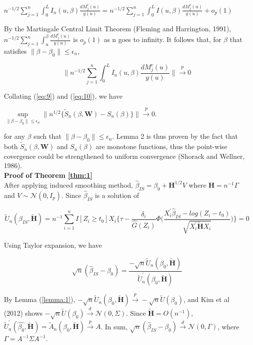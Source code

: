 \documentclass[12pt]{article}
\begin{document}
	\begin{center}
	$n^{-1/2}\sum_{j=1}^{n} \int_{0}^{L}I_n(u,\beta)\frac{dM_j^c(u)}{y(u)}=n^{-1/2}\sum_{j=1}^{n}\int_{0}^{L}I(u,\beta)\frac{dM_j^c(u)}{y(u)}+o_p(1)$
	\end{center}
	
	\noindent By the Martingale Central Limit Theorem (Fleming and Harrington, 1991), $n^{-1/2}\sum_{j=1}^{n}\int_{u}^{\beta}\frac{dM_j^c(u)}{y(u)}$ is $o_p(1)$ as n goes to infinity. It follows that, for $\beta$ that satisfies $\lVert \beta - \beta_0 \rVert \leq \epsilon_n$,
	
	\begin{equation} \label{eq:10}
	\Bigg\lVert n^{-1/2} \sum_{j=1}^{n} \int_{0}^{L} I_n(u,\beta)\frac{dM_j^c(u)}{y(u)} \Bigg\rVert \xrightarrow{p} 0
	\end{equation}
	
	\noindent Collating (\ref{eq:9}) and (\ref{eq:10}), we have
	\begin{center}
	$\sup\limits_{\lVert \beta - \beta_0 \rVert \leq \epsilon_n} \lVert {n^{1/2}} \{ \tilde{S}_n(\beta, \textbf{W})-S_n(\beta) \} \rVert \xrightarrow{p} 0$.
	\end{center}
	
	\noindent for any $\beta$ such that $\lVert \beta - \beta_0 \rVert \leq \epsilon_n$. Lemma 2 is thus proven by the fact that both $\tilde{S}_n(\beta, \textbf{W})$ and $S_n(\beta)$ are monotone functions, thus the point-wise covergence could be strengthened to uniform convergence (Shorack and Wellner, 1986).\\
	
	\noindent \textbf{Proof of Theorem \ref{thm:1}}\\
	After applying induced smoothing method, $\hat{\beta}_{IS} = \beta_0+\textbf{H}^{1/2}V$ where $\textbf{H}=n^{-1}\Gamma$ and $V \sim\mathcal{N}(0,I_p)$.
	Since $\hat{\beta}_{IS}$ is a solution of
	
	\begin{equation} \label{eq:11}
	\tilde{U}_n(\hat{\beta}_{IS}, \tilde{\textbf{H}})= n^{-1} \sum_{i=1}^{n} I[Z_i \geq t_0] X_i \Bigg\{\tau -  \frac{\delta_i}{\hat{G}(Z_i)}\Phi\Bigg(\frac{X_i^\prime\hat{\beta}_{IS}-log(Z_i-t_0)}{\sqrt{X_i^{\prime} \tilde{\textbf{H}}X_{i}}}\Bigg) \Bigg\}=0
	\end{equation}
	
	\noindent Using Taylor expansion, we have
	
	\begin{equation} \label{eq:12}
	\sqrt{n}(\hat{\beta}_{IS}-\beta_0) = \frac{-\sqrt{n}\tilde{U}_n(\beta_0, \tilde{\textbf{H}})}{\tilde{U}_n^{\prime}(\beta_0,\tilde{\textbf{H}})}
	\end{equation}
	
	\noindent By Lemma (\ref{lemma:1}), $-\sqrt{n}\tilde{U}_n(\beta_0, \tilde{\textbf{H}}) \xrightarrow{p} -\sqrt{n}\tilde{U}(\beta_0)$, and Kim et al (2012) shows $-\sqrt{n}\tilde{U}(\beta_0) \xrightarrow{d} \mathcal{N}(0,\Sigma)$. Since $\tilde{\textbf{H}}=O(n^{-1})$, $\tilde{U}_n^{\prime}(\hat{\beta_0},\tilde{\textbf{H}})=\tilde{A}_n(\beta_0, \tilde{\textbf{H}}) \xrightarrow{p} A$. In sum,
	$\sqrt{n}(\hat{\beta}_{IS}-\beta_0) \xrightarrow{d} \mathcal{N}(0,\Gamma)$, where $\Gamma = A^{-1}\Sigma A^{-1}$.
	
\end{document}

